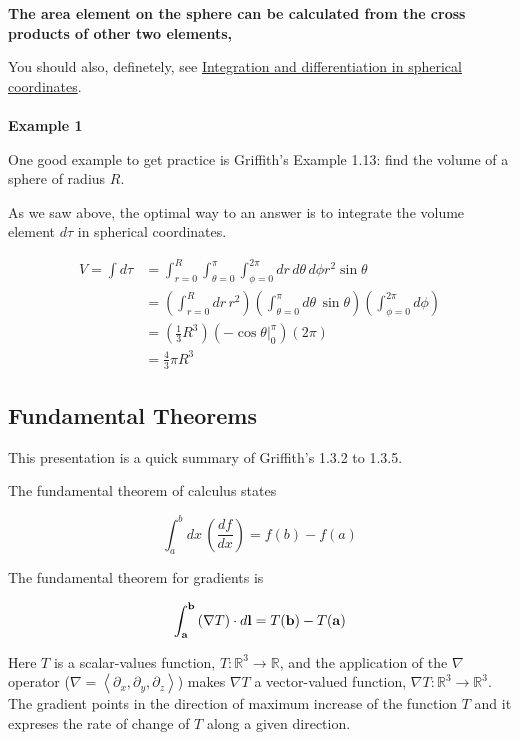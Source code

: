 \textbf{The area element on the sphere can be calculated from the cross products of other two elements,}

You should also, definetely, see
\href{https://en.wikipedia.org/wiki/Spherical_coordinate_system#Integration_and_differentiation_in_spherical_coordinates}{Integration and differentiation in spherical coordinates}.
\\~\\


\textbf{Example 1}

One good example to get practice is Griffith's Example 1.13: find the volume of a sphere of radius $R$.

As we saw above, the optimal way to an answer is to integrate the volume element $d\tau$ in spherical coordinates.

\begin{align*}
V = \int d\tau &=
\int_{r=0}^{R} \int_{\theta=0}^{\pi} \int_{\phi=0}^{2\pi} dr \, d\theta \, d\phi r^2 \sin\theta \\
&=  \left( \int_{r=0}^{R} dr \,r^2 \right)
    \left( \int_{\theta=0}^{\pi} d\theta \, \sin\theta \right)
    \left( \int_{\phi=0}^{2\pi} d\phi \right) \\
&= \left( \frac{1}{3} R^3 \right) \left( -\cos\theta \Big|_{0}^{\pi} \right) \left( 2\pi \right) \\
&= \frac{4}{3} \pi R^3
\end{align*}



\subsection{Fundamental Theorems} \label{section:funamental-theorems}

This presentation is a quick summary of Griffith's 1.3.2 to 1.3.5.

The fundamental theorem of calculus states

$$
\int_{a}^{b} dx \, \left(\frac{df}{dx}\right) = f(b) - f(a)
$$

The fundamental theorem for gradients is

$$
\int_{\boldsymbol{\mathbf{a}}}^{\boldsymbol{\mathbf{b}}} \left(\nabla T\right) \cdot d\boldsymbol{\mathbf{l}}
= T(\boldsymbol{\mathbf{b}}) - T(\boldsymbol{\mathbf{a}})
$$

Here $T$ is a scalar-values function, $T : \mathbb{R}^3 \rightarrow \mathbb{R}$, and the application of the
$\nabla$ operator ($\nabla = \left< \partial_x, \partial_y, \partial_z \right>$) makes $\nabla T$ a vector-valued function,
$\nabla T : \mathbb{R}^3 \rightarrow \mathbb{R}^3$.
The gradient points in the direction of maximum increase of the function $T$ and it expreses the rate of change of $T$
along a given direction.

